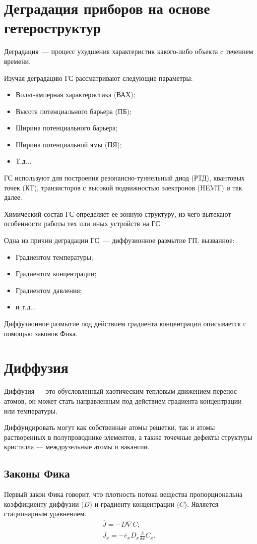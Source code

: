 \section{Деградация приборов на основе гетероструктур}
Деградация~--- процесс ухудшения характеристик какого-либо объекта c течением времени.

Изучая деградацию ГС рассматривают следующие параметры:
\begin{itemize}
	\item Вольт-амперная характеристика (ВАХ);
	\item Высота потенциального барьера (ПБ);
	\item Ширина потенциального барьера;
	\item Ширина потенциальной ямы (ПЯ);
	\item Т.д...
\end{itemize}

ГС используют для построения резонансно-туннельный диод (РТД), квантовых точек (КТ), транзисторов с высокой подвижностью электронов (HEMT) и так далее. 

Химический состав ГС определяет ее зонную структуру, из чего вытекают особенности работы тех или иных устройств на ГС.

Одна из причин деградации ГС~--- диффузионное размытие ГП, вызванное: 
\begin{itemize}
	\item Градиентом температуры; 
	\item Градиентом концентрации; 
	\item Градиентом давления; 
	\item и т.д... 
\end{itemize}

Диффузионное размытие под действием градиента концентрации описывается с помощью законов Фика.

\section{Диффузия}
Диффузия — это обусловленный хаотическим тепловым движением перенос атомов, он может стать направленным под действием градиента концентрации или температуры.

Диффундировать могут как собственные атомы решетки, так и атомы растворенных в полупроводнике элементов, а также точечные дефекты структуры кристалла — междоузельные атомы и вакансии.

\subsection{Законы Фика}
Первый закон Фика говорит, что плотность потока вещества пропорциональна коэффициенту диффузии ($D$) и градиенту концентрации ($C$). Является стационарным уравнением.
\begin{gather}
	\overline{J} = - D \nabla C;\\
	\overline{J}_{x} = - \overline{e}_{x}D_{x} \frac{\delta}{\delta x} C_{x}.\\
\end{gather}

